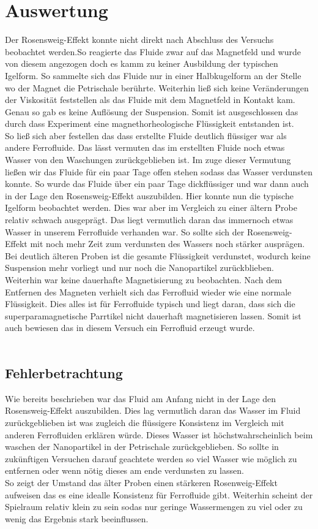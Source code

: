 \documentclass[a4paper]{TUBAFprotokoll}
\begin{document}
		\section{Auswertung}
		Der Rosensweig-Effekt konnte nicht direkt nach Abschluss des Versuchs beobachtet werden.So reagierte das Fluide zwar auf das Magnetfeld und wurde von diesem angezogen doch es kamm zu keiner Ausbildung der typischen Igelform. So sammelte sich das Fluide nur in einer Halbkugelform an der Stelle wo der Magnet die Petrischale berührte. Weiterhin ließ sich keine Veränderungen der Viskosität feststellen als das Fluide mit dem Magnetfeld in Kontakt kam. Genau so gab es keine Auflösung der Suspension. Somit ist ausgeschlossen das durch dass Experiment eine magnethorheologische Flüssigkeit entstanden ist.\\
		So ließ sich aber festellen das dass erstellte Fluide deutlich flüssiger war als andere Ferrofluide. Das lässt vermuten das im erstellten Fluide noch etwas Wasser von den Waschungen zurückgeblieben ist. Im zuge dieser Vermutung ließen wir das Fluide für ein paar Tage offen stehen sodass das Wasser verdunsten konnte. So wurde das Fluide über ein paar Tage dickflüssiger und war dann auch in der Lage den Rosensweig-Effekt auszubilden. Hier konnte nun die typische Igelform beobachtet werden. Dies war aber im Vergleich zu einer ältern Probe relativ schwach ausgeprägt. Das liegt vermutlich daran das immernoch etwas Wasser in unserem Ferrofluide verhanden war. So sollte sich der Rosensweig-Effekt mit noch mehr Zeit zum verdunsten des Wassers noch stärker ausprägen.\\
		Bei deutlich älteren Proben ist die gesamte Flüssigkeit verdunstet, wodurch keine Suspension mehr vorliegt und nur noch die Nanopartikel zurückblieben.\\
		Weiterhin war keine dauerhafte Magnetisierung zu beobachten. Nach dem Entfernen des Magneten verhielt sich das Ferrofluid wieder wie eine normale Flüssigkeit. Dies alles ist für Ferrofluide typisch und liegt daran, dass sich die superparamagnetische Parrtikel nicht dauerhaft magnetisieren lassen. Somit ist auch bewiesen das in diesem Versuch ein Ferrofluid erzeugt wurde.\\
		\\
		\subsection{Fehlerbetrachtung}
		Wie bereits beschrieben war das Fluid am Anfang nicht in der Lage den Rosensweig-Effekt auszubilden. Dies lag vermutlich daran das Wasser im Fluid zurückgeblieben ist was zugleich die flüssigere Konsistenz im Vergleich mit anderen Ferrofluiden erklären würde. Dieses Wasser ist höchstwahrscheinlich beim waschen der Nanopartikel in der Petrischale zurückgeblieben. So sollte in zukünftigen Versuchen darauf geachtete werden so viel Wasser wie möglich zu entfernen oder wenn nötig dieses am ende verdunsten zu lassen.\\
		So zeigt der Umstand das älter Proben einen stärkeren Rosenweig-Effekt aufweisen das es eine idealle Konsistenz für Ferrofluide gibt. Weiterhin scheint der Spielraum relativ klein zu sein sodas nur geringe Wassermengen zu viel oder zu wenig das Ergebnis stark beeinflussen.   
	
\end{document}
